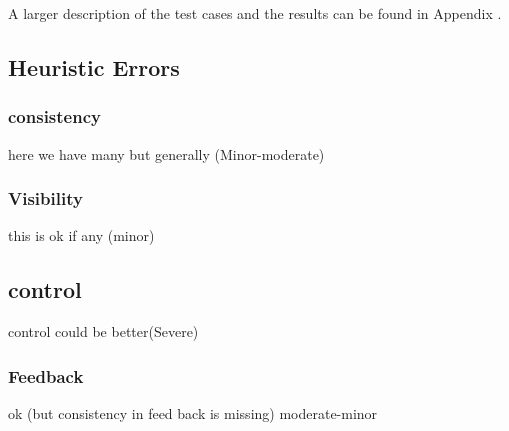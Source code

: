 A larger description of the test cases and the results can be found in Appendix \label{appen:testSuite}.

\subsection{Heuristic Errors}
 
\subsubsection{consistency}
here we have many but generally (Minor-moderate)

\subsubsection{Visibility}
this is ok if any (minor)

\subsection{control}
control could be better(Severe)

\subsubsection{Feedback}
ok (but consistency in feed back is missing) moderate-minor